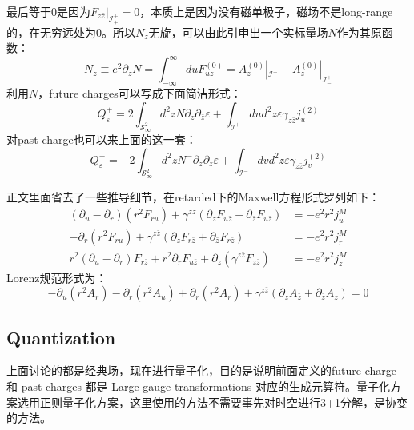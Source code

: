 最后等于0是因为$F_{z\bar z}|_{\mathcal{I}_{+}^{\pm}}=0$，本质上是因为没有磁单极子，磁场不是long-range的，在无穷远处为0。所以$N_z$无旋，可以由此引申出一个实标量场$N$作为其原函数：
\begin{equation}\label{eq:23.20}
	N_z\equiv e^2\partial_zN=\int_{-\infty}^{\infty}duF_{uz}^{(0)}=A_{z}^{(0)}|_{\mathcal{I}_{+}^{+}}-A_{z}^{(0)}|_{\mathcal{I}_{-}^{+}}
\end{equation}
利用$N$，future charges可以写成下面简洁形式：
\begin{equation}\label{eq:23.21}
	Q_{\varepsilon}^{+}=2\int_{\mathcal{S}_\infty^2} d^{2}zN\partial_{z}\partial_{\bar{z}}\varepsilon+\int_{\mathcal I^{+}}dud^{2}z\varepsilon\gamma_{z\bar{z}}j_{u}^{(2)}
\end{equation}
对past charge也可以来上面的这一套：
\begin{equation}\label{eq:23.21.2}
	Q_{\varepsilon}^{-}=-2\int_{\mathcal{S}_\infty^2} d^{2}zN^-\partial_{z}\partial_{\bar{z}}\varepsilon+\int_{\mathcal I^{-}}dvd^{2}z\varepsilon\gamma_{z\bar{z}}j_{v}^{(2)}
\end{equation}
\begin{remark}
	正文里面省去了一些推导细节，在retarded下的Maxwell方程形式罗列如下：
	\begin{equation}
		\begin{aligned}(\partial_u-\partial_r)\left(r^2F_{ru}\right)+\gamma^{z\bar{z}}\left(\partial_zF_{u\bar{z}}+\partial_{\bar{z}}F_{u\bar{z}}\right)&=-e^2r^2j^M_u\\-\partial_r\left(r^2F_{ru}\right)+\gamma^{z\bar{z}}\left(\partial_zF_{r\bar{z}}+\partial_{\bar{z}}F_{r\bar{z}}\right)&=-e^2r^2j^M_r\\r^2\left(\partial_u-\partial_r\right)F_{r\bar{z}}+r^2\partial_rF_{u\bar{z}}+\partial_z\left(\gamma^{z\bar{z}}F_{z\bar{z}}\right)&=-e^2r^2j^M_z\end{aligned}
	\end{equation}
	Lorenz规范形式为：
	\begin{equation}
		-\partial_u\left(r^2A_r\right)-\partial_r\left(r^2A_u\right)+\partial_r\left(r^2A_r\right)+\gamma^{z\bar{z}}\left(\partial_zA_{\bar{z}}+\partial_{\bar{z}}A_z\right)=0
	\end{equation}
\end{remark}
\subsection{Quantization}
上面讨论的都是经典场，现在进行量子化，目的是说明前面定义的future charge 和 past charges 都是 Large gauge transformations 对应的生成元算符。量子化方案选用正则量子化方案，这里使用的方法不需要事先对时空进行3+1分解，是协变的方法\cite{Ashtekar1987AsymptoticQ,Frolov:1979ab,1989thyg.book.....H,Lee:1990nz,Wald:1999wa}。

